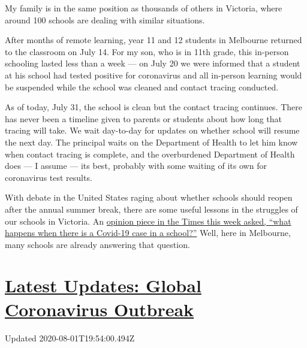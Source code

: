 My family is in the same position as thousands of others in Victoria,
where around 100 schools are dealing with similar situations.

After months of remote learning, year 11 and 12 students in Melbourne
returned to the classroom on July 14. For my son, who is in 11th grade,
this in-person schooling lasted less than a week --- on July 20 we were
informed that a student at his school had tested positive for
coronavirus and all in-person learning would be suspended while the
school was cleaned and contact tracing conducted.

As of today, July 31, the school is clean but the contact tracing
continues. There has never been a timeline given to parents or students
about how long that tracing will take. We wait day-to-day for updates on
whether school will resume the next day. The principal waits on the
Department of Health to let him know when contact tracing is complete,
and the overburdened Department of Health does --- I assume --- its
best, probably with some waiting of its own for coronavirus test
results.

With debate in the United States raging about whether schools should
reopen after the annual summer break, there are some useful lessons in
the struggles of our schools in Victoria. An
\href{https://www.nytimes3xbfgragh.onion/2020/07/28/opinion/coronavirus-schools-reopening.html?searchResultPosition=2}{opinion
piece in the Times this week asked, ``what happens when there is a
Covid-19 case in a school?''} Well, here in Melbourne, many schools are
already answering that question.

\hypertarget{latest-updates-global-coronavirus-outbreak}{%
\section{\texorpdfstring{\href{https://www.nytimes3xbfgragh.onion/2020/08/01/world/coronavirus-covid-19.html?action=click\&pgtype=Article\&state=default\&region=MAIN_CONTENT_1\&context=storylines_live_updates}{Latest
Updates: Global Coronavirus
Outbreak}}{Latest Updates: Global Coronavirus Outbreak}}\label{latest-updates-global-coronavirus-outbreak}}

Updated 2020-08-01T19:54:00.494Z

